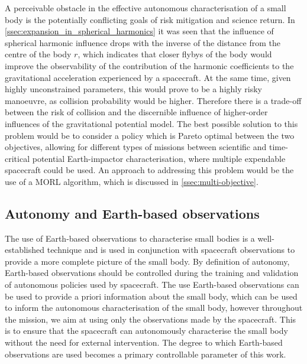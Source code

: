 A perceivable obstacle in the effective autonomous characterisation of a small body is the potentially conflicting goals of risk mitigation and science return. In \autoref{ssec:expansion_in_spherical_harmonics} it was seen that the influence of spherical harmonic influence drops with the inverse of the distance from the centre of the body $r$, which indicates that closer flybys of the body would improve the observability of the contribution of the harmonic coefficients to the gravitational acceleration experienced by a spacecraft. At the same time, given highly unconstrained parameters, this would prove to be a highly risky manoeuvre, as collision probability would be higher. Therefore there is a trade-off between the risk of collision and the discernible influence of higher-order influences of the gravitational potential model. The best possible solution to this problem would be to consider a policy which is Pareto optimal between the two objectives, allowing for different types of missions between scientific and time-critical potential Earth-impactor characterisation, where multiple expendable spacecraft could be used. An approach to addressing this problem would be the use of a \gls{MORL} algorithm, which is discussed in \autoref{ssec:multi-objective}.

\subsection{Autonomy and Earth-based observations}\label{ssec:insight:autonomy-earth-based}

The use of Earth-based observations to characterise small bodies is a well-established technique and is used in conjunction with spacecraft observations to provide a more complete picture of the small body. By definition of autonomy, Earth-based observations should be controlled during the training and validation of autonomous policies used by spacecraft. The use Earth-based observations can be used to provide a priori information about the small body, which can be used to inform the autonomous characterisation of the small body, however throughout the mission, we aim at using only the observations made by the spacecraft. This is to ensure that the spacecraft can autonomously characterise the small body without the need for external intervention. The degree to which Earth-based observations are used becomes a primary controllable parameter of this work. 


